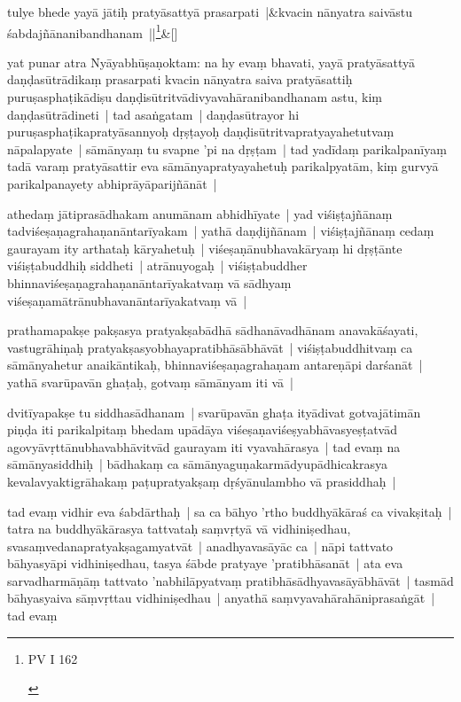 \documentclass[article,12pt,a4paper]{memoir}
\begin{document}
	    
	    \stanza[\smallbreak]
	tulye bhede yayā jātiḥ pratyāsattyā prasarpati |&kvacin nānyatra saivāstu śabdajñānanibandhanam ||\footnote{\begin{english}PV I 162\end{english}}\&[\smallbreak]


	

	  \pstart yat punar atra Nyāyabhūṣaṇoktam: na hy evaṃ bhavati, yayā pratyāsattyā daṇḍasūtrādikaṃ prasarpati kvacin nānyatra saiva pratyāsattiḥ puruṣasphaṭikādiṣu daṇḍisūtritvādivyavahāranibandhanam astu, kiṃ daṇḍasūtrādineti | tad asaṅgatam | daṇḍasūtrayor hi puruṣasphaṭikapratyāsannyoḥ dṛṣṭayoḥ daṇḍisūtritvapratyayahetutvaṃ nāpalapyate | sāmānyaṃ tu svapne 'pi na dṛṣṭam | tad yadīdaṃ parikalpanīyaṃ tadā varaṃ pratyāsattir eva sāmānyapratyayahetuḥ parikalpyatām, kiṃ gurvyā parikalpanayety abhiprāyāparijñānāt |
	\pend
      

	  \pstart {}\label{thakur75-65.1} athedaṃ jātiprasādhakam anumānam abhidhīyate | yad viśiṣṭajñānaṃ tadviśeṣaṇagrahaṇanāntarīyakam | yathā daṇḍijñānam | viśiṣṭajñānaṃ cedaṃ gaurayam ity arthataḥ kāryahetuḥ | viśeṣaṇānubhavakāryaṃ hi dṛṣṭānte viśiṣṭabuddhiḥ siddheti | atrānuyogaḥ | viśiṣṭabuddher bhinnaviśeṣaṇagrahaṇanāntarīyakatvaṃ vā sādhyaṃ viśeṣaṇamātrānubhavanāntarīyakatvaṃ vā |
	\pend
      

	  \pstart {}\label{thakur75-65.6} prathamapakṣe pakṣasya pratyakṣabādhā sādhanāvadhānam anavakāśayati, vastugrāhiṇaḥ pratyakṣasyobhayapratibhāsābhāvāt | viśiṣṭabuddhitvaṃ ca sāmānyahetur anaikāntikaḥ, bhinnaviśeṣaṇagrahaṇam antareṇāpi darśanāt | yathā svarūpavān ghaṭaḥ, gotvaṃ sāmānyam iti vā |
	\pend
      

	  \pstart {}\label{thakur75-65.10} dvitīyapakṣe tu siddhasādhanam | svarūpavān ghaṭa ityādivat gotvajātimān piṇḍa iti parikalpitaṃ bhedam upādāya viśeṣaṇaviśeṣyabhāvasyeṣṭatvād agovyāvṛttānubhavabhāvitvād gaurayam iti vyavahārasya | tad evaṃ na sāmānyasiddhiḥ | bādhakaṃ ca sāmānyaguṇakarmādyupādhicakrasya kevalavyaktigrāhakaṃ paṭupratyakṣaṃ dṛśyānulambho vā prasiddhaḥ |
	\pend
      

	  \pstart {}\label{thakur75-65.15} tad evaṃ vidhir eva śabdārthaḥ | sa ca bāhyo 'rtho buddhyākāraś ca vivakṣitaḥ | tatra na buddhyākārasya tattvataḥ saṃvṛtyā vā vidhiniṣedhau, svasaṃvedanapratyakṣagamyatvāt | anadhyavasāyāc ca | nāpi tattvato bāhyasyāpi vidhiniṣedhau, tasya śābde pratyaye 'pratibhāsanāt | ata eva sarvadharmāṇāṃ tattvato 'nabhilāpyatvaṃ pratibhāsādhyavasāyābhāvāt | tasmād bāhyasyaiva sāṃvṛttau vidhiniṣedhau | anyathā saṃvyavahārahāniprasaṅgāt | tad evaṃ
	\pend
      
\end{document}
